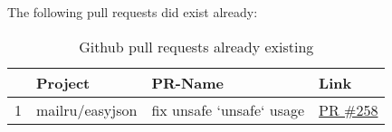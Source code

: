 The following pull requests did exist already:

\begin{table}[h]
    \centering
    \caption{Github pull requests already existing}
    \label{tbl:pull-requests-existing}
    \begin{tabularx}{\textwidth}{rlXl}
        \toprule
        {} & Project & PR-Name & Link \\
        \midrule
        1  & mailru/easyjson & fix unsafe `unsafe` usage & \href{https://github.com/mailru/easyjson/pull/258}{PR \#258} \\
        \bottomrule
    \end{tabularx}
\end{table}
